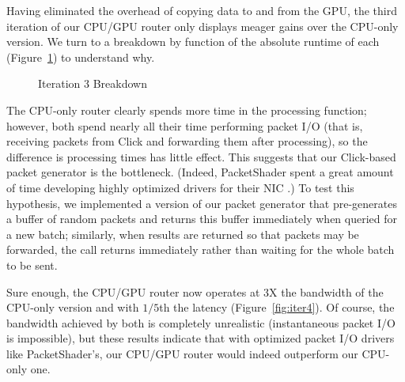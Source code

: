Having eliminated the overhead of copying data to and from the GPU, the third
iteration of our CPU/GPU router only displays meager gains over the CPU-only
version. We turn to a breakdown by function of the absolute runtime of each
(Figure~\ref{fig:iter3-breakdown}) to understand why.
\begin{figure}
    \centering
	\quad

    \caption{Iteration 3 Breakdown}
	\label{fig:iter3-breakdown}
\end{figure}

The CPU-only router clearly spends more time in the processing function;
however, both spend nearly all their time performing packet I/O (that is,
receiving packets from Click and forwarding them after processing), so the
difference is processing times has little effect. This suggests that our
Click-based packet generator is the bottleneck. (Indeed, PacketShader spent a
great amount of time developing highly optimized drivers for their NIC
\cite{Han}.) To test this hypothesis, we implemented a version of our packet
generator that pre-generates a buffer of random packets and returns this buffer
immediately when queried for a new batch; similarly, when results are returned
so that packets may be forwarded, the call returns immediately rather than
waiting for the whole batch to be sent.

Sure enough, the CPU/GPU router now operates at 3X the bandwidth of the
CPU-only version and with $1/5$th the latency (Figure~\ref{fig:iter4}). Of
course, the bandwidth achieved by both is completely unrealistic (instantaneous
packet I/O is impossible), but these results indicate that with optimized
packet I/O drivers like PacketShader's, our CPU/GPU router would indeed
outperform our CPU-only one.

